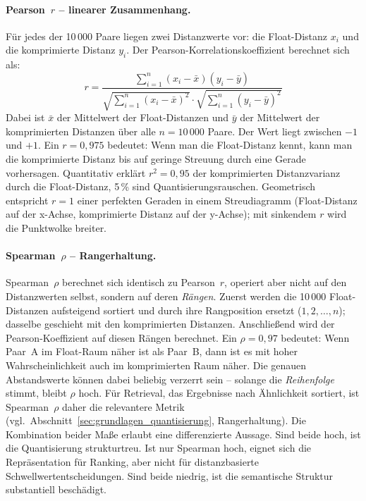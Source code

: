 \paragraph{Pearson~$r$ -- linearer Zusammenhang.}
Für jedes der 10\,000 Paare liegen zwei Distanzwerte vor: die Float-Distanz $x_i$ und die komprimierte Distanz $y_i$.
Der Pearson-Korrelationskoeffizient berechnet sich als:
\begin{equation}
  r = \frac{\sum_{i=1}^{n}(x_i - \bar{x})(y_i - \bar{y})}{\sqrt{\sum_{i=1}^{n}(x_i - \bar{x})^2} \cdot \sqrt{\sum_{i=1}^{n}(y_i - \bar{y})^2}}
  \label{eq:pearson}
\end{equation}
%
Dabei ist $\bar{x}$ der Mittelwert der Float-Distanzen und $\bar{y}$ der Mittelwert der komprimierten Distanzen über alle $n = 10\,000$ Paare.
Der Wert liegt zwischen $-1$ und $+1$.
Ein $r = 0{,}975$ bedeutet: Wenn man die Float-Distanz kennt, kann man die komprimierte Distanz bis auf geringe Streuung durch eine Gerade vorhersagen.
Quantitativ erklärt $r^2 = 0{,}95$ der komprimierten Distanzvarianz durch die Float-Distanz, 5\,\% sind Quantisierungsrauschen.
Geometrisch entspricht $r = 1$ einer perfekten Geraden in einem Streudiagramm (Float-Distanz auf der x-Achse, komprimierte Distanz auf der y-Achse); mit sinkendem $r$ wird die Punktwolke breiter.
%
\paragraph{Spearman~$\rho$ -- Rangerhaltung.}
Spearman~$\rho$ berechnet sich identisch zu Pearson~$r$, operiert aber nicht auf den Distanzwerten selbst, sondern auf deren \emph{Rängen}.
Zuerst werden die 10\,000 Float-Distanzen aufsteigend sortiert und durch ihre Rangposition ersetzt ($1, 2, \ldots, n$); dasselbe geschieht mit den komprimierten Distanzen.
Anschließend wird der Pearson-Koeffizient auf diesen Rängen berechnet.
%
Ein $\rho = 0{,}97$ bedeutet: Wenn Paar~A im Float-Raum näher ist als Paar~B, dann ist es mit hoher Wahrscheinlichkeit auch im komprimierten Raum näher.
Die genauen Abstandswerte können dabei beliebig verzerrt sein -- solange die \emph{Reihenfolge} stimmt, bleibt $\rho$ hoch.
Für Retrieval, das Ergebnisse nach Ähnlichkeit sortiert, ist Spearman~$\rho$ daher die relevantere Metrik (vgl.\ Abschnitt~\ref{sec:grundlagen_quantisierung}, Rangerhaltung).
%
Die Kombination beider Maße erlaubt eine differenzierte Aussage.
Sind beide hoch, ist die Quantisierung strukturtreu.
Ist nur Spearman hoch, eignet sich die Repräsentation für Ranking, aber nicht für distanzbasierte Schwellwertentscheidungen.
Sind beide niedrig, ist die semantische Struktur substantiell beschädigt.
%
